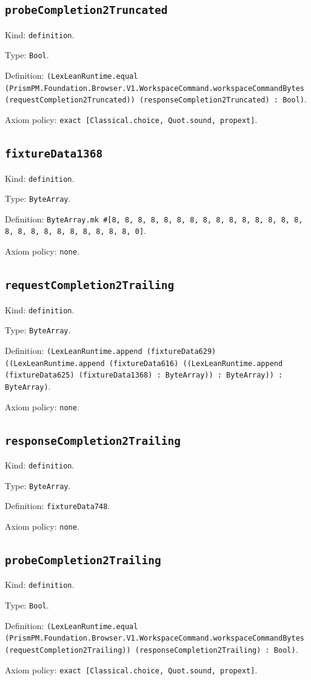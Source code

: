 \documentclass[11pt]{article}
\begin{document}
\subsection*{\texttt{probeCompletion2Truncated}}
\noindent Kind: \texttt{definition}.\par
\noindent Type: \texttt{Bool}.\par
\noindent Definition: \texttt{(LexLeanRuntime.equal (PrismPM.Foundation.Browser.V1.WorkspaceCommand.workspaceCommandBytes (requestCompletion2Truncated)) (responseCompletion2Truncated) : Bool)}.\par
\noindent Axiom policy: \texttt{exact [Classical.choice, Quot.sound, propext]}.\par
\subsection*{\texttt{fixtureData1368}}
\noindent Kind: \texttt{definition}.\par
\noindent Type: \texttt{ByteArray}.\par
\noindent Definition: \texttt{ByteArray.mk \#[8, 8, 8, 8, 8, 8, 8, 8, 8, 8, 8, 8, 8, 8, 8, 8, 8, 8, 8, 8, 8, 8, 8, 8, 8, 0]}.\par
\noindent Axiom policy: \texttt{none}.\par
\subsection*{\texttt{requestCompletion2Trailing}}
\noindent Kind: \texttt{definition}.\par
\noindent Type: \texttt{ByteArray}.\par
\noindent Definition: \texttt{(LexLeanRuntime.append (fixtureData629) ((LexLeanRuntime.append (fixtureData616) ((LexLeanRuntime.append (fixtureData625) (fixtureData1368) : ByteArray)) : ByteArray)) : ByteArray)}.\par
\noindent Axiom policy: \texttt{none}.\par
\subsection*{\texttt{responseCompletion2Trailing}}
\noindent Kind: \texttt{definition}.\par
\noindent Type: \texttt{ByteArray}.\par
\noindent Definition: \texttt{fixtureData748}.\par
\noindent Axiom policy: \texttt{none}.\par
\subsection*{\texttt{probeCompletion2Trailing}}
\noindent Kind: \texttt{definition}.\par
\noindent Type: \texttt{Bool}.\par
\noindent Definition: \texttt{(LexLeanRuntime.equal (PrismPM.Foundation.Browser.V1.WorkspaceCommand.workspaceCommandBytes (requestCompletion2Trailing)) (responseCompletion2Trailing) : Bool)}.\par
\noindent Axiom policy: \texttt{exact [Classical.choice, Quot.sound, propext]}.\par
\end{document}
